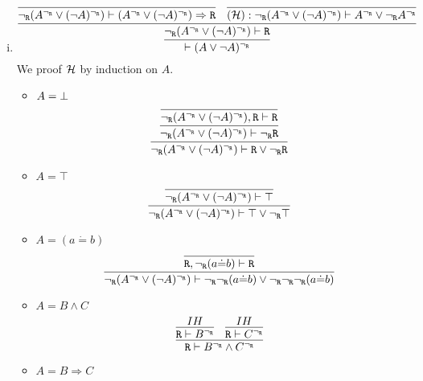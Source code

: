 \begin{enumerate}[(i)]
    \item 
    $$
        \infer{
            \vdash (A\vee \neg A)^\ngr
        }{
            \infer{
                \ngr(A^\ngr\vee (\neg A)^\ngr) \vdash \R
            }{
                \infer{
                    \ngr(A^\ngr\vee (\neg A)^\ngr) \vdash (A^\ngr\vee (\neg A)^\ngr) \Rightarrow \R
                }{
                }&
                \infer{
                    (\H) : \ngr(A^\ngr\vee (\neg A)^\ngr) \vdash A^\ngr\vee \ngr A^\ngr
                }{
                }
            }
        }
    $$
    We proof $\mathcal{H}$ by induction on $A$.
    
    \begin{itemize}
        \item $A=\bot$
            $$
                \infer{
                    \ngr(A^\ngr\vee (\neg A)^\ngr) \vdash \R \vee \ngr \R
                }{
                    \infer{
                        \ngr(A^\ngr\vee (\neg A)^\ngr) \vdash \ngr \R
                    }{
                        \infer{
                            \ngr(A^\ngr\vee (\neg A)^\ngr), \R \vdash \R
                        }{
                        }
                    }
                }
            $$
        \item $A=\top$
            $$
                \infer{
                    \ngr(A^\ngr\vee (\neg A)^\ngr) \vdash \top \vee \ngr\top
                }{
                    \infer{
                        \ngr(A^\ngr\vee (\neg A)^\ngr) \vdash \top
                    }{
                    }
                }
            $$
        \item $A=(a\dot{=}b)$
            $$
                \infer{
                    \ngr(A^\ngr\vee (\neg A)^\ngr) \vdash \ngr\ngr(a\dot{=}b) \vee \ngr\ngr\ngr (a\dot{=}b)
                }{
                    \infer{
                        \R, \ngr(a\dot{=}b) \vdash \R
                    }{
                    }
                }
            $$
        \item $A=B\wedge C$
            $$
                \infer{
                    \R \vdash B^\ngr \wedge C^\ngr
                }{
                    \infer{
                        \R \vdash B^\ngr
                    }{
                        IH
                    }&
                    \infer{
                        \R \vdash C^\ngr
                    }{
                        IH
                    }
                }
            $$
        \item $A=B \Rightarrow C$

\end{itemize}
\end{enumerate}
